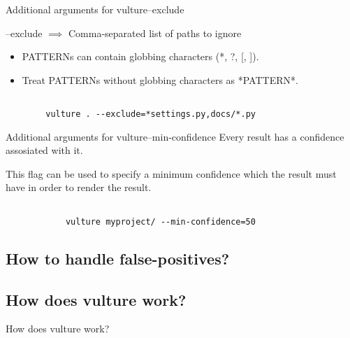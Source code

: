 \documentclass{beamer}
\begin{document}
\begin{frame}{Additional arguments for vulture}{--exclude}
    
--exclude \begin{math} \implies \end{math} Comma-separated list of paths to ignore 

\begin{itemize}
    \item PATTERNs can contain globbing
    characters (*, ?, [, ]).
    \item Treat PATTERNs without
    globbing characters as *PATTERN*.
\end{itemize}


\begin{example}
        \begin{verbatim}

        vulture . --exclude=*settings.py,docs/*.py

        \end{verbatim}
        
\end{example}
\end{frame}

\begin{frame}{Additional arguments for vulture}{--min-confidence}
Every result has a confidence assosiated with it.

This flag can be used to specify a minimum confidence which the result must have in order to render the result.

\begin{example}
        \begin{verbatim}

            vulture myproject/ --min-confidence=50

        \end{verbatim}

\end{example}
\end{frame}

\subsection{How to handle false-positives?}

\subsection{How does vulture work?}

\begin{frame}{How does vulture work?}
\end{frame}
\end{document}
